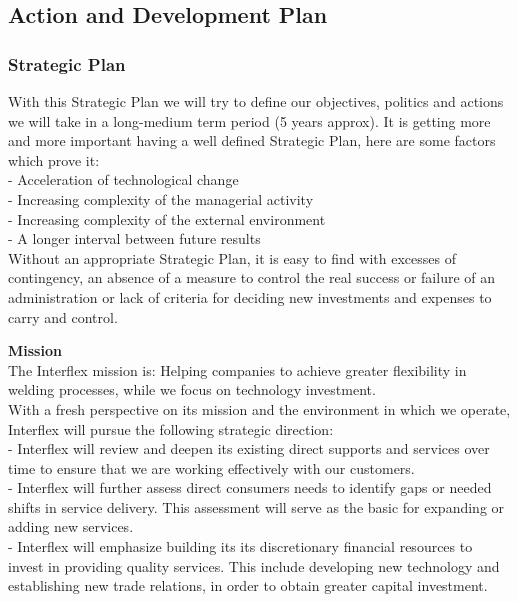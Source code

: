 \subsection{Action and Development Plan}
\subsubsection{Strategic Plan}

With this Strategic Plan we will try to define our objectives, politics and actions we will take in a long-medium term period (5 years approx). It is getting more and more important having a well defined Strategic Plan, here are some factors which prove it:\\
	- Acceleration of technological change\\
	- Increasing complexity of the managerial activity\\
	- Increasing complexity of the external environment\\
	- A longer interval between future results\\
Without an appropriate Strategic Plan, it is easy to find with excesses of contingency, an absence of a measure to control the real success or failure of an administration or lack of criteria for deciding new investments and expenses to carry and control.

\textbf{Mission}\\
The Interflex mission is:
Helping companies to achieve greater flexibility in welding processes, while we focus on technology investment.\\

With a fresh perspective on its mission and the environment in which we operate, Interflex will pursue the following strategic direction:\\
	- Interflex will review and deepen its existing direct supports and services over time to ensure that we are working effectively with our customers.\\
	- Interflex will further assess direct consumers needs to identify gaps or needed shifts in service delivery. This assessment will serve as the basic for expanding or adding new services.\\
	- Interflex will emphasize building its its discretionary financial resources to invest in providing quality services. This include developing new technology and establishing new trade relations, in order to obtain greater capital investment.

